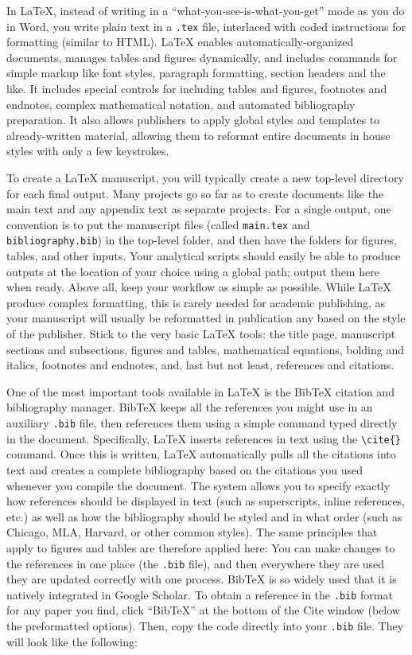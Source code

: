 In {\LaTeX}, instead of writing in a
``what-you-see-is-what-you-get'' mode as you do in Word,
you write plain text in a \texttt{.tex} file,
interlaced with coded instructions for formatting (similar to HTML).
{\LaTeX} enables automatically-organized documents,
manages tables and figures dynamically,
and includes commands for simple markup
like font styles, paragraph formatting, section headers and the like.
It includes special controls for including tables and figures,
footnotes and endnotes, complex mathematical notation, and automated bibliography preparation.
It also allows publishers to apply global styles and templates to already-written material,
allowing them to reformat entire documents in house styles with only a few keystrokes.

To create a {\LaTeX} manuscript,
you will typically create a new top-level directory for each final output.
Many projects go so far as to create documents like the main text
and any appendix text as separate projects.
For a single output, one convention is to put the manuscript files
(called \texttt{main.tex} and \texttt{bibliography.bib})
in the top-level folder,
and then have the folders for figures, tables, and other inputs.
Your analytical scripts should easily be able to produce outputs
at the location of your choice using a global path;
output them here when ready.
Above all, keep your workflow as simple as possible.
While {\LaTeX}  produce complex formatting,
this is rarely needed for academic publishing,
as your manuscript will usually be reformatted in publication any
based on the style of the publisher.
Stick to the very basic {\LaTeX} tools:
the title page, manuscript sections and subsections,
figures and tables, mathematical equations,
bolding and italics, footnotes and endnotes,
and, last but not least, references and citations.

One of the most important tools available in {\LaTeX}
is the BibTeX citation and bibliography manager.\cite{kopka1995guide}
BibTeX keeps all the references you might use in an auxiliary \texttt{.bib} file,
then references them using a simple command typed directly in the document.
Specifically, {\LaTeX} inserts references in text using the \texttt{\textbackslash cite\{\}} command.
Once this is written, {\LaTeX} automatically pulls all the citations into text
and creates a complete bibliography based on the citations you used whenever you compile the document.
The system allows you to specify exactly how references should be displayed in text
(such as superscripts, inline references, etc.)
as well as how the bibliography should be styled and in what order
(such as Chicago, MLA, Harvard, or other common styles).
The same principles that apply to figures and tables are therefore applied here:
You can make changes to the references in one place (the \texttt{.bib} file),
and then everywhere they are used they are updated correctly with one process.
BibTeX is so widely used that it is natively integrated in Google Scholar.
To obtain a reference in the \texttt{.bib} format for any paper you find,
click ``BibTeX'' at the bottom of the Cite window (below the preformatted options).
Then, copy the code directly into your \texttt{.bib} file.
They will look like the following:

